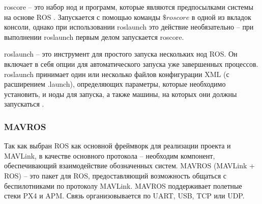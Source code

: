 roscore -- это набор нод и программ, которые являются предпосылками системы на основе ROS \cite{ros}. Запускается с помощью команды \(\$ roscore\) в одной из вкладок консоли, однако при использовании roslaunch это действие необязательно -- при выполнении roslaunch первым делом запускается roscore.

roslaunch -- это инструмент для простого запуска нескольких нод ROS. Он включает в себя опции для автоматического запуска уже завершенных процессов. roslaunch принимает один или несколько файлов конфигурации XML (с расширением .launch), определяющих параметры, которые необходимо установить, и ноды для запуска, а также машины, на которых они должны запускаться \cite{ros}.

\subsubsection{MAVROS}
Так как выбран ROS как основной фреймворк для реализации проекта и MAVLink, в качестве основного протокола -- необходим компонент, обеспечивающий взаимодействие обозначенных систем.
MAVROS (MAVLink + ROS) -- это пакет для ROS, предоставляющий возможность общаться с беспилотниками по протоколу MAVLink. MAVROS поддерживает полетные стеки PX4 и APM. Связь организовывается по UART, USB, TCP или UDP.

